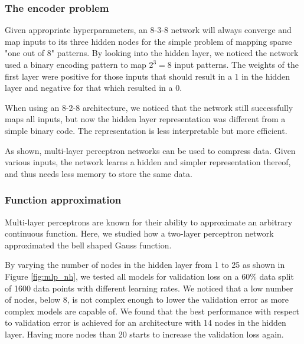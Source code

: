 \documentclass[a4paper]{article}
\begin{document}
\subsubsection{The encoder problem}

Given appropriate hyperparameters, an 8-3-8 network will always converge and map inputs to its three hidden nodes for the simple problem of mapping sparse "one out of 8" patterns. By looking into the hidden layer, we noticed the network used a binary encoding pattern to map $2^{3}=8$ input patterns. The weights of the first layer were positive for those inputs that should result in a $1$ in the hidden layer and negative for that which resulted in a $0$.

When using an 8-2-8 architecture, we noticed that the network still successfully maps all inputs, but now the hidden layer representation was different from a simple binary code. The representation is less interpretable but more efficient. %

As shown, multi-layer perceptron networks can be used to compress data. Given various inputs, the network learns a hidden and simpler representation thereof, and thus needs less memory to store the same data.

\subsubsection{Function approximation}

Multi-layer perceptrons are known for their ability to approximate an arbitrary continuous function. Here, we studied how a two-layer perceptron network approximated the bell shaped Gauss function.

By varying the number of nodes in the hidden layer from 1 to 25 as shown in Figure \ref{fig:mlp_nh}, we tested all models for validation loss on a 60\% data split of 1600 data points with different learning rates. We noticed that a low number of nodes, below 8, is not complex enough to lower the validation error as more complex models are capable of. We found that the best performance with respect to validation error is achieved for an architecture with 14 nodes in the hidden layer. Having more nodes than 20 starts to increase the validation loss again.
\end{document}
